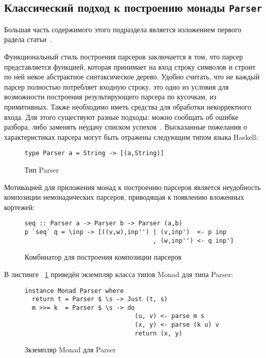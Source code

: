 \subsection{Классический подход к построению монады \lstinline{Parser}}

Большая часть содержимого этого подраздела является изложением первого радела статьи~\autocite{MonParsing}.

Функциональный стиль построения парсеров заключается в том, что парсер представляется функцией, которая принимает на вход строку символов и строит по ней некое абстрактное синтаксическое дерево. Удобно считать, что не каждый парсер полностью потребляет входную строку, это одно из условия для возможности построения результирующего парсера по кусочкам, из примитивных. Также необходимо иметь средства для обработки некорректного входа. Для этого существуют разные подходы: можно сообщать об ошибке разбора, либо заменять неудачу списком успехов~\autocite{WadlerSuccess}. Высказанные пожелания о характеристиках парсера могут быть отражены следующим типом языка Haskell: 

\begin{figure}[h]
\begin{lstlisting}
type Parser a = String -> [(a,String)]
\end{lstlisting}
\caption{Тип Parser}
\end{figure}

Мотивацией для приложения монад к построению парсеров является неудобность композиции немонадических парсеров, приводящая к появлению вложенных кортежей: 

\begin{figure}[h]
\begin{lstlisting}
seq :: Parser a -> Parser b -> Parser (a,b)
p `seq` q = \inp -> [((v,w),inp'') | (v,inp')  <- p inp
                                   , (w,inp'') <- q inp']
\end{lstlisting}
\caption{Комбинатор для построения композиции парсеров}
\end{figure}

В листинге ~\ref{listing:MonadParser} приведён экземпляр класса типов Monad для типа Parser: 

\begin{figure}[t]
  \begin{lstlisting}
instance Monad Parser where
  return t = Parser $ \s -> Just (t, s)
  m >>= k  = Parser $ \s -> do 
                              (u, v) <- parse m s
                              (x, y) <- parse (k u) v
                              return (x, y)
  \end{lstlisting}
  \caption{Зкземпляр Monad для Parser}
  \label{listing:MonadParser}
\end{figure}

